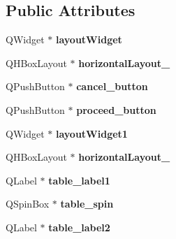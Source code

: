 \subsection*{Public Attributes}
\begin{DoxyCompactItemize}
\item 
\hypertarget{class_ui___dialog_aeb2e76ae84a3a2c7943003b31fab3807}{
QWidget $\ast$ {\bfseries layoutWidget}}
\label{class_ui___dialog_aeb2e76ae84a3a2c7943003b31fab3807}

\item 
\hypertarget{class_ui___dialog_a937a02037ef2834dcab1b14df066bc6f}{
QHBoxLayout $\ast$ {\bfseries horizontalLayout\_}}
\label{class_ui___dialog_a937a02037ef2834dcab1b14df066bc6f}

\item 
\hypertarget{class_ui___dialog_a5fa5f2b7f29d6d4bb0501e4348699871}{
QPushButton $\ast$ {\bfseries cancel\_\-button}}
\label{class_ui___dialog_a5fa5f2b7f29d6d4bb0501e4348699871}

\item 
\hypertarget{class_ui___dialog_a7f3697eebd238553ccbb5f716a16b00b}{
QPushButton $\ast$ {\bfseries proceed\_\-button}}
\label{class_ui___dialog_a7f3697eebd238553ccbb5f716a16b00b}

\item 
\hypertarget{class_ui___dialog_a9d40c4a031bcdc91ddc3500788f43a2c}{
QWidget $\ast$ {\bfseries layoutWidget1}}
\label{class_ui___dialog_a9d40c4a031bcdc91ddc3500788f43a2c}

\item 
\hypertarget{class_ui___dialog_aa5f63a5d3fdda1bfb39eaae06259f7de}{
QHBoxLayout $\ast$ {\bfseries horizontalLayout\_}}
\label{class_ui___dialog_aa5f63a5d3fdda1bfb39eaae06259f7de}

\item 
\hypertarget{class_ui___dialog_a36913ded6b51b775719ffa4e49e955e2}{
QLabel $\ast$ {\bfseries table\_\-label1}}
\label{class_ui___dialog_a36913ded6b51b775719ffa4e49e955e2}

\item 
\hypertarget{class_ui___dialog_a505c0f026238a3e175f9e08e201713d7}{
QSpinBox $\ast$ {\bfseries table\_\-spin}}
\label{class_ui___dialog_a505c0f026238a3e175f9e08e201713d7}

\item 
\hypertarget{class_ui___dialog_a5ff04656bb940476c6880b7cca7a05a7}{
QLabel $\ast$ {\bfseries table\_\-label2}}
\label{class_ui___dialog_a5ff04656bb940476c6880b7cca7a05a7}


\end{DoxyCompactItemize}

